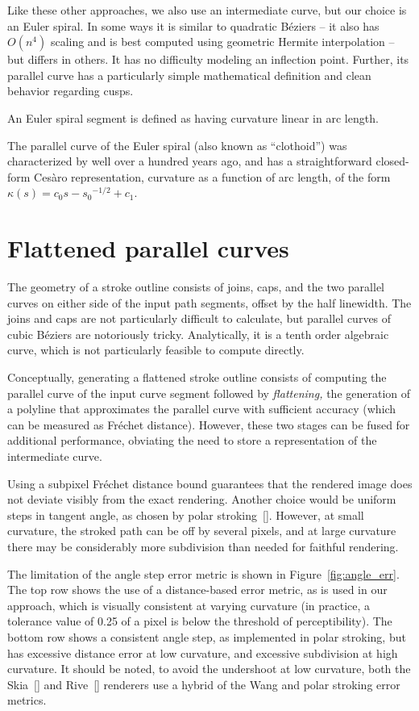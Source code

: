 \documentclass[sigconf, nonacm]{acmart}
\begin{document}
Like these other approaches, we also use an intermediate curve, but our choice is an Euler spiral. In some ways it is similar to quadratic Béziers -- it also has $O(n^4)$ scaling and is best computed using geometric Hermite interpolation -- but differs in others. It has no difficulty modeling an inflection point. Further, its parallel curve has a particularly simple mathematical definition and clean behavior regarding cusps.

An Euler spiral segment is defined as having curvature linear in arc length.

The parallel curve of the Euler spiral (also known as ``clothoid'') was characterized by \citet{Wieleitner1907} well over a hundred years ago, and has a straightforward closed-form Cesàro representation, curvature as a function of arc length, of the form $\kappa(s) = c_0{s - s_0}^{-1/2} + c_1$.

\section{Flattened parallel curves}

The geometry of a stroke outline consists of joins, caps, and the two parallel curves on either side of the input path segments, offset by the half linewidth. The joins and caps are not particularly difficult to calculate, but parallel curves of cubic Béziers are notoriously tricky. Analytically, it is a tenth order algebraic curve, which is not particularly feasible to compute directly.

Conceptually, generating a flattened stroke outline consists of computing the parallel curve of the input curve segment followed by \emph{flattening,} the generation of a polyline that approximates the parallel curve with sufficient accuracy (which can be measured as Fréchet distance). However, these two stages can be fused for additional performance, obviating the need to store a representation of the intermediate curve.

Using a subpixel Fréchet distance bound guarantees that the rendered image does not deviate visibly from the exact rendering. Another choice would be uniform steps in tangent angle, as chosen by polar stroking~[]. However, at small curvature, the stroked path can be off by several pixels, and at large curvature there may be considerably more subdivision than needed for faithful rendering.

The limitation of the angle step error metric is shown in Figure~\ref{fig:angle_err}. The top row shows the use of a distance-based error metric, as is used in our approach, which is visually consistent at varying curvature (in practice, a tolerance value of 0.25 of a pixel is below the threshold of perceptibility). The bottom row shows a consistent angle step, as implemented in polar stroking, but has excessive distance error at low curvature, and excessive subdivision at high curvature. It should be noted, to avoid the undershoot at low curvature, both the Skia~[] and Rive~[] renderers use a hybrid of the Wang and polar stroking error metrics.
\end{document}
